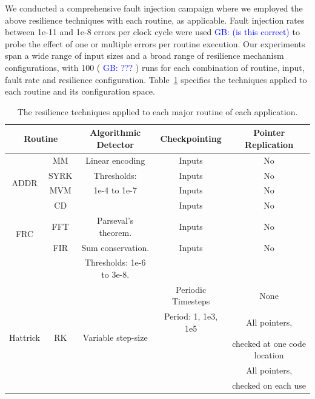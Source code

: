 \documentclass[10pt, conference, compsocconf]{IEEEtran}
\newcommand{\greg}[1]{%
  \textcolor{blue}{GB: #1}
}
\begin{document}
We conducted a comprehensive fault injection campaign where we employed the above resilience techniques with each routine, as applicable.
Fault injection rates between 1e-11 and 1e-8 errors per clock cycle were used\greg{(is this correct)} to probe the effect of one or multiple errors per routine execution.
Our experiments span a wide range of input sizes and a broad range of resilience mechanism configurations, with 100 (\greg{???}) runs for each combination of routine, input, fault rate and resilience configuration.
Table~\ref{tbl:configs} specifies the techniques applied to each routine and its configuration space.
\begin{table}
  \begin{tabular}{|c|c|c|c|c|}
    \hline
    \multicolumn{2}{|c|}{Routine}          & Algorithmic Detector             & Checkpointing         & Pointer Replication  \\
    \hline
    \multirow{4}{*}{ADDR}      & MM   & Linear encoding                     & Inputs                & No \\
                               & SYRK & Thresholds:                         & Inputs                & No \\
                               & MVM  & 1e-4 to 1e-7                        & Inputs                & No \\
                               & CD   &                                     & Inputs                & No \\
    \hline
    \multirow{2}{*}{FRC}       & FFT  & Parseval's theorem.                 & Inputs                & No \\
                               & FIR  & Sum conservation.                   & Inputs                & No \\
                               &      & Thresholds: 1e-6 to 3e-8.           &                            \\
    \hline
    \multirow{5}{*}{Hattrick}  & \multirow{5}{*}{RK} & \multirow{5}{*}{Variable step-size} & Periodic Timesteps    & None  \\
                               &      &                                   & Period: 1, 1e3, 1e5   & All pointers, \\
                               &      &                                   &                       & checked at one code location \\
                               &      &                                   &                       & All pointers, \\
                               &      &                                   &                       & checked on each use \\
    \hline
  \end{tabular}
  \caption{The resilience techniques applied to each major routine of each application.}
  \label{tbl:configs}
\end{table}
\end{document}
